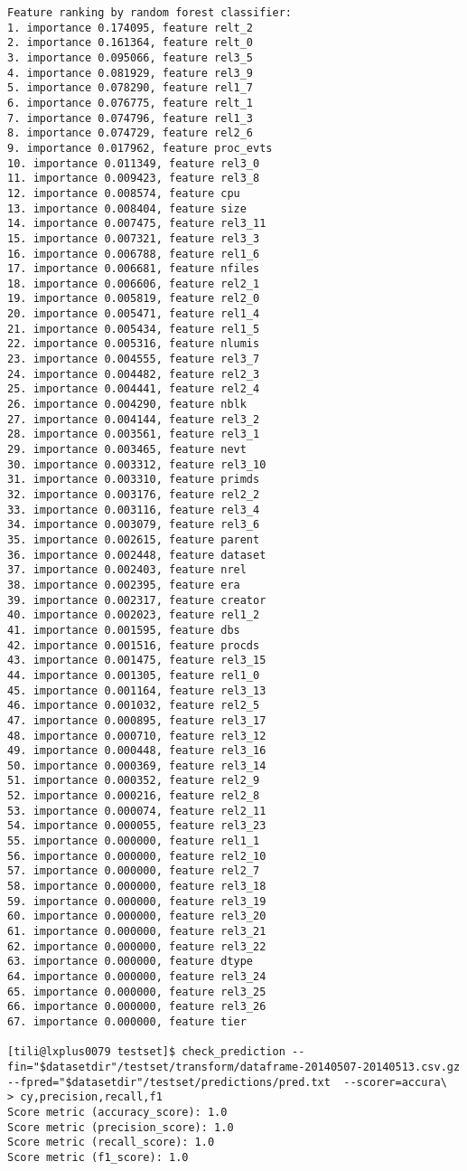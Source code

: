 \begin{verbatim}
Feature ranking by random forest classifier:
1. importance 0.174095, feature relt_2
2. importance 0.161364, feature relt_0
3. importance 0.095066, feature rel3_5
4. importance 0.081929, feature rel3_9
5. importance 0.078290, feature rel1_7
6. importance 0.076775, feature relt_1
7. importance 0.074796, feature rel1_3
8. importance 0.074729, feature rel2_6
9. importance 0.017962, feature proc_evts
10. importance 0.011349, feature rel3_0
11. importance 0.009423, feature rel3_8
12. importance 0.008574, feature cpu
13. importance 0.008404, feature size
14. importance 0.007475, feature rel3_11
15. importance 0.007321, feature rel3_3
16. importance 0.006788, feature rel1_6
17. importance 0.006681, feature nfiles
18. importance 0.006606, feature rel2_1
19. importance 0.005819, feature rel2_0
20. importance 0.005471, feature rel1_4
21. importance 0.005434, feature rel1_5
22. importance 0.005316, feature nlumis
23. importance 0.004555, feature rel3_7
24. importance 0.004482, feature rel2_3
25. importance 0.004441, feature rel2_4
26. importance 0.004290, feature nblk
27. importance 0.004144, feature rel3_2
28. importance 0.003561, feature rel3_1
29. importance 0.003465, feature nevt
30. importance 0.003312, feature rel3_10
31. importance 0.003310, feature primds
32. importance 0.003176, feature rel2_2
33. importance 0.003116, feature rel3_4
34. importance 0.003079, feature rel3_6
35. importance 0.002615, feature parent
36. importance 0.002448, feature dataset
37. importance 0.002403, feature nrel
38. importance 0.002395, feature era
39. importance 0.002317, feature creator
40. importance 0.002023, feature rel1_2
41. importance 0.001595, feature dbs
42. importance 0.001516, feature procds
43. importance 0.001475, feature rel3_15
44. importance 0.001305, feature rel1_0
45. importance 0.001164, feature rel3_13
46. importance 0.001032, feature rel2_5
47. importance 0.000895, feature rel3_17
48. importance 0.000710, feature rel3_12
49. importance 0.000448, feature rel3_16
50. importance 0.000369, feature rel3_14
51. importance 0.000352, feature rel2_9
52. importance 0.000216, feature rel2_8
53. importance 0.000074, feature rel2_11
54. importance 0.000055, feature rel3_23
55. importance 0.000000, feature rel1_1
56. importance 0.000000, feature rel2_10
57. importance 0.000000, feature rel2_7
58. importance 0.000000, feature rel3_18
59. importance 0.000000, feature rel3_19
60. importance 0.000000, feature rel3_20
61. importance 0.000000, feature rel3_21
62. importance 0.000000, feature rel3_22
63. importance 0.000000, feature dtype
64. importance 0.000000, feature rel3_24
65. importance 0.000000, feature rel3_25
66. importance 0.000000, feature rel3_26
67. importance 0.000000, feature tier

[tili@lxplus0079 testset]$ check_prediction --fin="$datasetdir"/testset/transform/dataframe-20140507-20140513.csv.gz  --fpred="$datasetdir"/testset/predictions/pred.txt  --scorer=accura\
> cy,precision,recall,f1
Score metric (accuracy_score): 1.0
Score metric (precision_score): 1.0
Score metric (recall_score): 1.0
Score metric (f1_score): 1.0
\end{verbatim}
